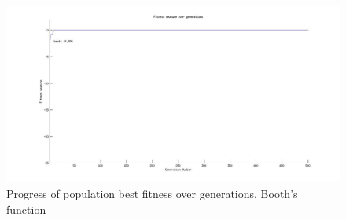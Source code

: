 \documentclass[a4paper]{article}
\begin{document}
\begin{figure}[hb!]
\centering
\includegraphics[width=\textwidth]{Booth_fitness_vs_generation.jpg}
\caption{Progress of population best fitness over generations, Booth's function}
\label{B2F}
\end{figure}
\end{document}
